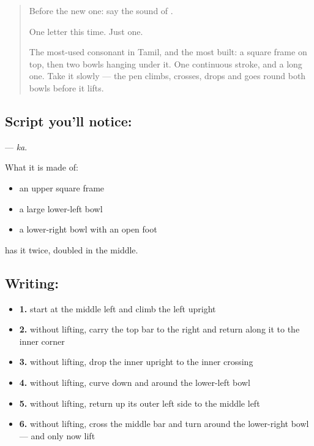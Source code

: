 \begin{quote}
Before the new one: say the sound of \textbf{}.

One letter this time. Just one.

The most-used consonant in Tamil, and the most built: a square frame on top, then two bowls hanging under it. One continuous stroke, and a long one. Take it slowly — the pen climbs, crosses, drops and goes round both bowls before it lifts.
\end{quote}

\subsection*{Script you'll notice: }
\textbf{} — \emph{ka}.

What it is made of:

\begin{itemize}
\raggedright
  \item an upper square frame
  \item a large lower-left bowl
  \item a lower-right bowl with an open foot
\end{itemize}

 has it twice, doubled in the middle.

\subsection*{Writing: }

\begin{itemize}
\raggedright
  \item \textbf{1.} start at the middle left and climb the left upright
  \item \textbf{2.} without lifting, carry the top bar to the right and return along it to the inner corner
  \item \textbf{3.} without lifting, drop the inner upright to the inner crossing
  \item \textbf{4.} without lifting, curve down and around the lower-left bowl
  \item \textbf{5.} without lifting, return up its outer left side to the middle left
  \item \textbf{6.} without lifting, cross the middle bar and turn around the lower-right bowl — and only now lift
\end{itemize}

